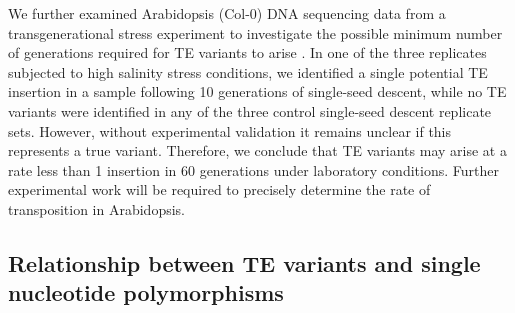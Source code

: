 \documentclass[12pt]{article}
\begin{document}
We further examined Arabidopsis (Col-0) DNA sequencing data from a
transgenerational stress experiment to investigate the possible minimum
number of generations required for TE variants to arise
\cite{Jiang:2014ih}. In one of the three replicates subjected to high
salinity stress conditions, we identified a single potential TE
insertion in a sample following 10 generations of single-seed descent,
while no TE variants were identified in any of the three control
single-seed descent replicate sets. However, without experimental
validation it remains unclear if this represents a true variant.
Therefore, we conclude that TE variants may arise at a rate less than 1
insertion in 60 generations under laboratory conditions. Further
experimental work will be required to precisely determine the rate of
transposition in Arabidopsis.

\subsection{Relationship between TE variants and single nucleotide
polymorphisms}
\end{document}
